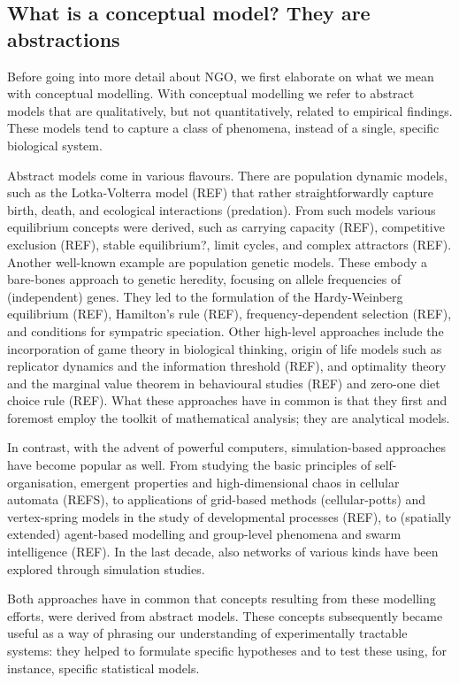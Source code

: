 \subsection{What is a conceptual model? They are abstractions}

Before going into more detail about NGO, we first elaborate on what we mean with conceptual modelling. With conceptual modelling we refer to abstract models that are qualitatively, but not quantitatively, related to empirical findings. These models tend to capture a class of phenomena, instead of a single, specific biological system.

Abstract models come in various flavours. There are population dynamic models, such as the Lotka-Volterra model (REF) that rather straightforwardly capture birth, death, and ecological interactions (predation). From such models various equilibrium concepts were derived, such as carrying capacity (REF), competitive exclusion (REF), stable equilibrium?, limit cycles, and complex attractors (REF). Another well-known example are population genetic models. These embody a bare-bones approach to genetic heredity, focusing on allele frequencies of (independent) genes. They led to the formulation of the Hardy-Weinberg equilibrium (REF), Hamilton’s rule (REF), frequency-dependent selection (REF), and conditions for sympatric speciation. Other high-level approaches include the incorporation of game theory in biological thinking, origin of life models such as replicator dynamics and the information threshold (REF), and optimality theory and the marginal value theorem in behavioural studies (REF) and zero-one diet choice rule (REF). What these approaches have in common is that they first and foremost employ the toolkit of mathematical analysis; they are analytical models.

In contrast, with the advent of powerful computers, simulation-based approaches have become popular as well. From studying the basic principles of self-organisation, emergent properties and high-dimensional chaos in cellular automata (REFS), to applications of grid-based methods (cellular-potts) and vertex-spring models in the study of developmental processes (REF), to (spatially extended) agent-based modelling and group-level phenomena and swarm intelligence (REF). In the last decade, also networks of various kinds have been explored through simulation studies.

Both approaches have in common that concepts resulting from these modelling efforts, were derived from abstract models. These concepts subsequently became useful as a way of phrasing our understanding of experimentally tractable systems: they helped to formulate specific hypotheses and to test these using, for instance, specific statistical models.
  